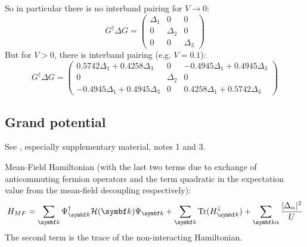 \documentclass[../notes.tex]{subfiles}
\begin{document}
So in particular there is no interband pairing for \(V \to 0\):
\begin{equation}
	G^{\dagger} \Delta G =
	\begin{pmatrix}
		\Delta_1 & 0 & 0 \\
		0 & \Delta_{2} & 0 \\
		0 & 0 & \Delta_3
	\end{pmatrix}
\end{equation}
But for \(V > 0\), there is interband pairing (e.g. \(V = 0.1\)):
\begin{equation}
	G^{\dagger} \Delta G =
	\begin{pmatrix}
		0.5742 \Delta_{1} + 0.4258 \Delta_{3} & 0 & - 0.4945 \Delta_{1} + 0.4945 \Delta_{3} \\
		0 & \Delta_{2} & 0 \\
		- 0.4945 \Delta_{1} + 0.4945 \Delta_{3} & 0 & 0.4258 \Delta_{1} + 0.5742 \Delta_{3}
	\end{pmatrix}
\end{equation}

\subsection{Grand potential}

See \cite{peottaSuperfluidityTopologicallyNontrivial2015}, especially supplementary material, notes 1 and 3.

Mean-Field Hamiltonian (with the last two terms due to exchange of anticommuting fermion operators and the term quadratic in the expectation value from the mean-field decoupling respectively):
\begin{equation}
	H_{MF} = \sum_{\vb{k}} \Psi_{\vb{k}}^{\dagger} \mathcal{H} (\vb{k}) \Psi_{\vb{k}} + \sum_{\vb{k}} \Tr(H^{\downarrow}_{\vb{k}}) + \sum_{\vb{k} \alpha} \frac{\vert \Delta_{\alpha} \vert^2}{U}
\end{equation}
The second term is the trace of the non-interacting Hamiltonian.
\end{document}
